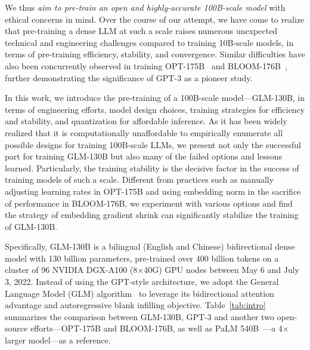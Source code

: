 We thus \textit{aim to pre-train an open and highly-accurate 100B-scale model} with ethical concerns in mind. Over the course of our attempt, we have come to realize that pre-training a dense LLM at such a scale raises numerous unexpected technical and engineering challenges compared to training 10B-scale models, in terms of pre-training efficiency, stability, and convergence. Similar difficulties have also been concurrently observed in training OPT-175B~\citep{zhang2022opt} and BLOOM-176B~\citep{scao2022what}, further demonstrating the significance of GPT-3 as a pioneer study. 

In this work, we introduce the pre-training of a 100B-scale model---GLM-130B, in terms of engineering efforts, model design choices, training strategies for efficiency and stability, and quantization for affordable inference. As it has been widely realized that it is computationally unaffordable to empirically enumerate all possible designs for training 100B-scale LLMs, we present not only the successful part for training GLM-130B but also many of the failed options and lessons learned. Particularly, the training stability is {the} decisive factor in the success of training models of such a scale. Different from practices such as manually adjusting learning rates in OPT-175B and using embedding norm in the sacrifice of performance in BLOOM-176B, we experiment with various options and find the strategy of embedding gradient shrink can significantly stabilize the training of GLM-130B.  

Specifically, GLM-130B is a bilingual (English and Chinese) bidirectional dense model with 130 billion parameters, pre-trained over 400 billion tokens on a cluster of 96 NVIDIA DGX-A100 (8$\times$40G) GPU nodes between May 6 and July 3, 2022. Instead of using the GPT-style architecture, we adopt the  General Language Model (GLM) algorithm~\citep{du2022glm} to leverage its bidirectional attention advantage and autoregressive blank infilling objective. 
Table~\ref{tab:intro} summarizes the comparison between GLM-130B, GPT-3 and another two open-source efforts---OPT-175B and BLOOM-176B, as well as PaLM 540B~\citep{chowdhery2022palm}---a 4$\times$ larger model---as a reference. 

